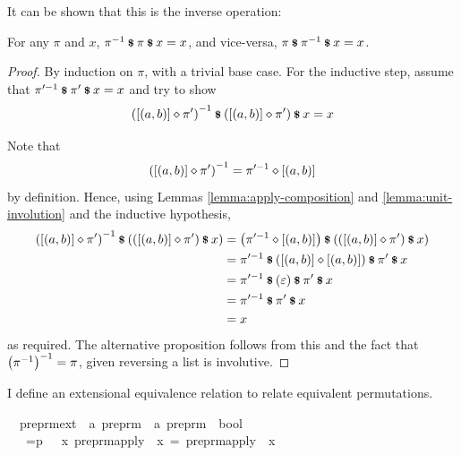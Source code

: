 It can be shown that this is the inverse operation:

\begin{lemma}
\label{lemma:inverse-involution}
For any \(\pi\) and \(x\), \(\pi^{-1} \mathbin{\textrm{\footnotesize{\textbf{\$}}}} \pi \mathbin{\textrm{\footnotesize{\textbf{\$}}}} x = x\), and vice-versa, \(\pi \mathbin{\textrm{\footnotesize{\textbf{\$}}}} \pi^{-1} \mathbin{\textrm{\footnotesize{\textbf{\$}}}} x = x\).
\end{lemma}
\begin{proof}
By induction on \(\pi\), with a trivial base case.
For the inductive step, assume that \(\pi'^{-1} \mathbin{\textrm{\footnotesize{\textbf{\$}}}} \pi' \mathbin{\textrm{\footnotesize{\textbf{\$}}}} x = x\) and try to show
\[
\left([\left(a, b\right)] \diamond \pi'\right)^{-1} \mathbin{\textrm{\footnotesize{\textbf{\$}}}} \left([\left(a, b\right)] \diamond \pi'\right) \mathbin{\textrm{\footnotesize{\textbf{\$}}}} x = x
\]

Note that
\[
\left([\left(a, b\right)] \diamond \pi'\right)^{-1} = \pi'^{-1} \diamond [\left(a, b\right)]
\]
by definition.
Hence, using Lemmas \ref{lemma:apply-composition} and \ref{lemma:unit-involution} and the inductive hypothesis,
\begin{align*}
\left([\left(a, b\right)] \diamond \pi'\right)^{-1} \mathbin{\textrm{\footnotesize{\textbf{\$}}}} \left(\left([\left(a, b\right)] \diamond \pi'\right) \mathbin{\textrm{\footnotesize{\textbf{\$}}}} x\right)
&= \left(\pi'^{-1} \diamond [\left(a, b\right)]\right) \mathbin{\textrm{\footnotesize{\textbf{\$}}}} \left(\left([\left(a, b\right)] \diamond \pi'\right) \mathbin{\textrm{\footnotesize{\textbf{\$}}}} x\right)\\
&= \pi'^{-1} \mathbin{\textrm{\footnotesize{\textbf{\$}}}} \left([\left(a, b\right)] \diamond [\left(a, b\right)]\right) \mathbin{\textrm{\footnotesize{\textbf{\$}}}} \pi' \mathbin{\textrm{\footnotesize{\textbf{\$}}}} x\\
&= \pi'^{-1} \mathbin{\textrm{\footnotesize{\textbf{\$}}}} \left(\varepsilon\right) \mathbin{\textrm{\footnotesize{\textbf{\$}}}} \pi' \mathbin{\textrm{\footnotesize{\textbf{\$}}}} x\\
&= \pi'^{-1} \mathbin{\textrm{\footnotesize{\textbf{\$}}}} \pi' \mathbin{\textrm{\footnotesize{\textbf{\$}}}} x\\
&= x\\
\end{align*}
as required.
The alternative proposition follows from this and the fact that \(\left(\pi^{-1}\right)^{-1} = \pi\), given reversing a list is involutive.
\end{proof}

I define an extensional equivalence relation to relate equivalent permutations.

\begin{implementation}
\isamarkupfalse%
\isanewline
\ \ preprm{\isacharunderscore}ext\ {\isacharcolon}{\isacharcolon}\ {\isachardoublequoteopen}{\isacharprime}a\ preprm\ {\isasymRightarrow}\ {\isacharprime}a\ preprm\ {\isasymRightarrow}\ bool{\isachardoublequoteclose}\isanewline
\ \ \isanewline
\ \ {\isachardoublequoteopen}{\isasympi}\ =p\ {\isasymsigma}\ {\isasymequiv}\ {\isasymforall}x{\isachardot}\ preprm{\isacharunderscore}apply\ {\isasympi}\ x\ =\ preprm{\isacharunderscore}apply\ {\isasymsigma}\ x{\isachardoublequoteclose}
\end{implementation}

